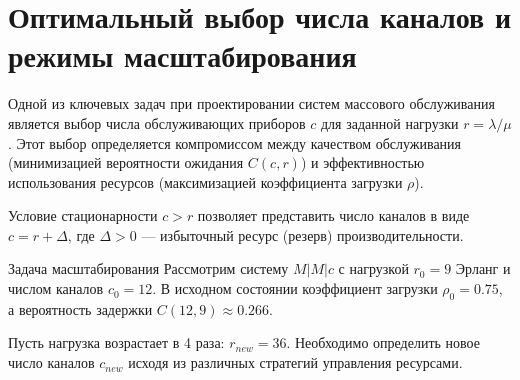 \begin{center}
\end{center}

\section{Оптимальный выбор числа каналов и режимы масштабирования}

Одной из ключевых задач при проектировании систем массового обслуживания является выбор числа обслуживающих приборов $c$ для заданной нагрузки $r = \lambda/\mu$. Этот выбор определяется компромиссом между качеством обслуживания (минимизацией вероятности ожидания $C(c, r)$) и эффективностью использования ресурсов (максимизацией коэффициента загрузки $\rho$).

Условие стационарности $c > r$ позволяет представить число каналов в виде $c = r + \Delta$, где $\Delta > 0$ — избыточный ресурс (резерв) производительности.

\begin{example}{Задача масштабирования}
Рассмотрим систему $M|M|c$ с нагрузкой $r_0 = 9$ Эрланг и числом каналов $c_0 = 12$. В исходном состоянии коэффициент загрузки $\rho_0 = 0.75$, а вероятность задержки $C(12, 9) \approx 0.266$.

Пусть нагрузка возрастает в 4 раза: $r_{new} = 36$. Необходимо определить новое число каналов $c_{new}$ исходя из различных стратегий управления ресурсами.
\end{example}

